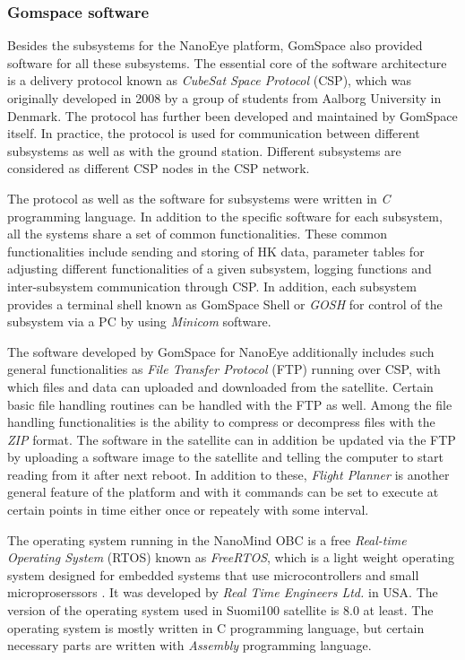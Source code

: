 \documentclass[english,12pt,a4paper,pdftex,elec,utf8]{aaltothesis}
\begin{document}
\subsubsection{Gomspace software}
Besides the subsystems for the NanoEye platform, GomSpace also provided software for all these subsystems. The essential core of the software architecture is a delivery protocol known as \textit{CubeSat Space Protocol} (CSP), which was originally developed in 2008 by a group of students from Aalborg University in Denmark. The protocol has further been developed and maintained by GomSpace itself. In practice, the protocol is used for communication between different subsystems as well as with the ground station. Different subsystems are considered as different CSP nodes in the CSP network. \cite{gomspacesdk}\par 
The protocol as well as the software for subsystems were written in \textit{C} programming language. In addition to the specific software for each subsystem, all the systems share a set of common functionalities. These common functionalities include sending and storing of HK data, parameter tables for adjusting different functionalities of a given subsystem, logging functions and inter-subsystem communication through CSP. In addition, each subsystem provides a terminal shell known as GomSpace Shell or \textit{GOSH} for control of the subsystem via a PC by using \textit{Minicom} software. \cite{gomspacesdk} \par 
The software developed by GomSpace for NanoEye additionally includes such general functionalities as \textit{File Transfer Protocol} (FTP) running over CSP, with which files and data can uploaded and downloaded from the satellite. Certain basic file handling routines can be handled with the FTP as well. Among the file handling functionalities is the ability to compress or decompress files with the \textit{ZIP} format. The software in the satellite can in addition be updated via the FTP by uploading a software image to the satellite and telling the computer to start reading from it after next reboot. In addition to these, \textit{Flight Planner} is another general feature of the platform and with it commands can be set to execute at certain points in time either once or repeately with some interval. \cite{gomspacesdk}\par
The operating system running in the NanoMind OBC is a free \textit{Real-time Operating System} (RTOS) known as \textit{FreeRTOS}, which is a light weight operating system designed for embedded systems that use microcontrollers and small microproserssors \cite{freertosref}. It was developed by \textit{Real Time Engineers Ltd.} in USA. The version of the operating system used in Suomi100 satellite is 8.0 at least. The operating system is mostly written in C programming language, but certain necessary parts are written with \textit{Assembly} programming language.\par 
\end{document}
